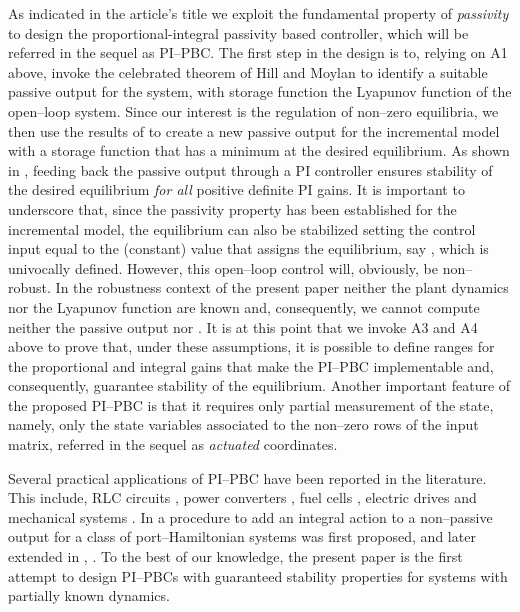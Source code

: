 \documentclass[10pt, conference]{ieeeconf}
\begin{document}
As indicated in the article's title we exploit the fundamental property of {\em passivity} to design the proportional-integral passivity based controller, which will be referred in the sequel as PI--PBC. The first step in the design is to, relying on A1 above, invoke the celebrated theorem of Hill and Moylan \cite{VAN} to identify a suitable passive output for the system,  with storage function the Lyapunov function of the open--loop system. Since our interest is the regulation of non--zero equilibria, we then use the results of \cite{JAYetal} to create a new passive output for the incremental model with a storage function that has a minimum at the desired equilibrium. As shown in \cite{JAYetal}, feeding back the passive output through a PI controller ensures stability of the desired equilibrium {\em for all} positive definite PI gains. It is important to underscore that, since the passivity property has been established for the incremental model, the equilibrium can also be stabilized setting the control input equal to the (constant) value that assigns the equilibrium, say , which is univocally defined. However, this open--loop control will, obviously, be non--robust. In the robustness context of the present paper neither the plant dynamics nor the Lyapunov function are known and, consequently, we cannot compute neither the passive output nor . It is at this point that we invoke A3 and A4 above to prove that, under these assumptions, it is possible to define ranges for the proportional and integral gains that make the PI--PBC implementable and, consequently, guarantee stability of the equilibrium. Another important feature of the proposed PI--PBC is that it requires only partial measurement of the state, namely, only the  state variables associated to the non--zero rows of the input matrix, referred in the sequel as {\em actuated} coordinates.

Several practical applications of PI--PBC have been reported in the literature. This include, RLC circuits \cite{CASetal}, power converters \cite{HERetal}, fuel cells \cite{TALetal}, electric drives \cite{MARALE} and mechanical systems \cite{SANetal}. In \cite{DONJUN} a procedure to add an integral action to a non--passive output for a class of port--Hamiltonian systems was first proposed, and later extended in \cite{ORTROM}, \cite{ROMDONORT}. To the best of our knowledge, the present paper is the first attempt to design PI--PBCs with guaranteed stability properties for systems with partially known dynamics.
\end{document}
